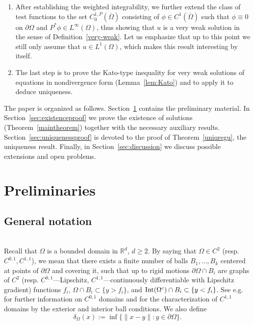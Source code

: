 \documentclass[12pt,a4paper]{amsart}
\theoremstyle{definition}
\newcommand{\R}{\mathbb{R}}
\begin{document}
\begin{enumerate}[label={\textup{\textbf{\arabic*)}}}]
    \item After establishing the weighted integrability, we further extend the class of test functions to the set $C^{1,P}_0(\overline{\Omega})$ consisting of $\phi\in C^1(\overline{\Omega})$ such that $\phi\equiv 0$ on $\partial \Omega$ and $P^*\phi\in L^\infty(\Omega)$, thus showing that $u$ is a very weak solution in the sense of Definition~\ref{very-weak}. Let us emphasize that up to this point we still only assume that $u\in L^1(\Omega)$, which makes this result interesting by itself.
    \item The last step is to prove the Kato-type inequality for very weak solutions of equations in nondivergence form (Lemma~\ref{lem:Kato}) and to apply it to deduce uniqueness.
\end{enumerate}

\smallskip

 The paper is organized as follows. Section~\ref{prelimin} contains the preliminary material. In Section~\ref{sec:existenceproof} we prove the existence of solutions (Theorem~\ref{maintheorem}) together with the necessary auxiliary results. Section~\ref{sec:uniquenessproof} is devoted to the proof of Theorem~\ref{uniqregu}, the uniqueness result. Finally, in Section~\ref{sec:discussion} we discuss possible extensions and open problems. 

\section{Preliminaries}\label{prelimin}
\subsection{General notation}\label{general-notation} \ \medskip \\
 Recall that $\Omega$ is a bounded domain in $\R^d$, $d\geq 2$. By saying that $\Omega\in C^2$ (resp. $C^{0,1}, C^{1,1}$), we mean that there exists a finite number of balls $B_1,\ldots,B_k$ centered at points of $\partial \Omega$ and covering it, such that up to rigid motions $\partial\Omega\cap B_i$ are graphs of $C^2$ (resp. $C^{0,1}$---Lipschitz, $C^{1,1}$---continuously differentiable with Lipschitz gradient) functions $f_i$, $\Omega\cap B_i \subset \{y > f_i\}$, and ${\rm Int}(\Omega^c)\cap B_i \subset \{y < f_i\}$. See e.g.~\cite{MR482102} for further information on $C^{0,1}$ domains and \cite{MR2286038} for the characterization of $C^{1,1}$ domains by the exterior and interior ball conditions. We also define 
\begin{equation}\label{d-omega}
\delta_\Omega(x) := \inf\{\lVert x-y \rVert: y\in \partial \Omega\}.
\end{equation}\smallskip
\end{document}
